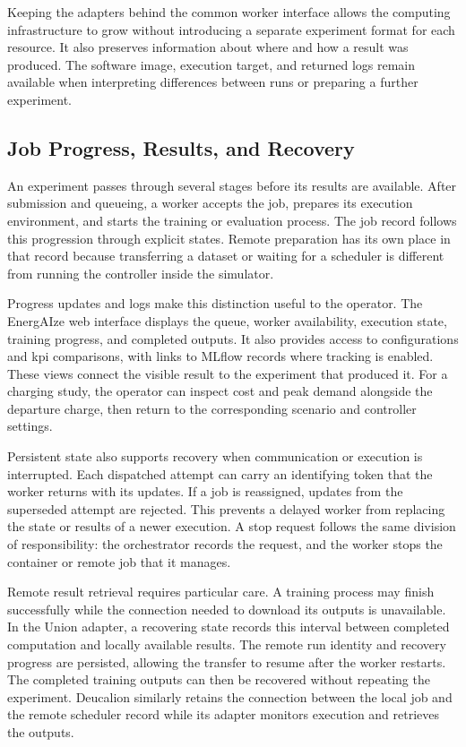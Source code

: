 Keeping the adapters behind the common worker interface allows the computing infrastructure to grow without introducing a separate experiment format for each resource. It also preserves information about where and how a result was produced. The software image, execution target, and returned logs remain available when interpreting differences between runs or preparing a further experiment.

\subsection{Job Progress, Results, and Recovery}
\label{sec:energaize-job-recovery}

An experiment passes through several stages before its results are available. After submission and queueing, a worker accepts the job, prepares its execution environment, and starts the training or evaluation process. The job record follows this progression through explicit states. Remote preparation has its own place in that record because transferring a dataset or waiting for a scheduler is different from running the controller inside the simulator.

Progress updates and logs make this distinction useful to the operator. The EnergAIze web interface displays the queue, worker availability, execution state, training progress, and completed outputs. It also provides access to configurations and \gls{kpi} comparisons, with links to MLflow records where tracking is enabled. These views connect the visible result to the experiment that produced it. For a charging study, the operator can inspect cost and peak demand alongside the departure charge, then return to the corresponding scenario and controller settings.

Persistent state also supports recovery when communication or execution is interrupted. Each dispatched attempt can carry an identifying token that the worker returns with its updates. If a job is reassigned, updates from the superseded attempt are rejected. This prevents a delayed worker from replacing the state or results of a newer execution. A stop request follows the same division of responsibility: the orchestrator records the request, and the worker stops the container or remote job that it manages.

Remote result retrieval requires particular care. A training process may finish successfully while the connection needed to download its outputs is unavailable. In the Union adapter, a recovering state records this interval between completed computation and locally available results. The remote run identity and recovery progress are persisted, allowing the transfer to resume after the worker restarts. The completed training outputs can then be recovered without repeating the experiment. Deucalion similarly retains the connection between the local job and the remote scheduler record while its adapter monitors execution and retrieves the outputs.

